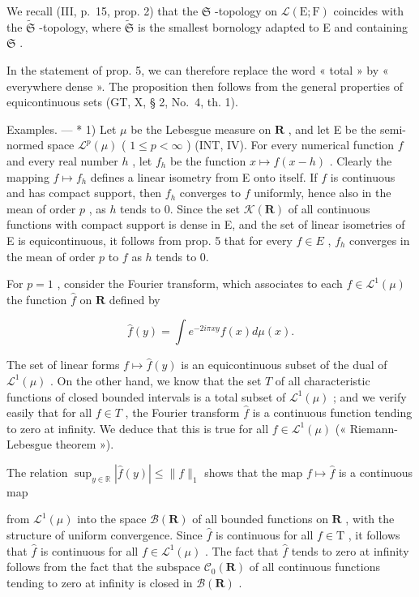 We recall (III, p.~15, prop. 2) that the \(\mathfrak{S}\) -topology on \(\mathcal{L}(\mathrm{E};\mathrm{F})\) coincides with the \(\tilde{\mathfrak{S}}\) -topology, where \(\tilde{\mathfrak{S}}\) is the smallest bornology adapted to E and containing \(\mathfrak{S}\) .

In the statement of prop. 5, we can therefore replace the word « total » by « everywhere dense ». The proposition then follows from the general properties of equicontinuous sets (GT, X, § 2, No.~4, th. 1).

Examples. --- * 1) Let \(\mu\) be the Lebesgue measure on \(\mathbf{R}\) , and let E be the semi-normed space \(\mathcal{L}^p(\mu)\) ( \(1 \leqslant p < \infty\) ) (INT, IV). For every numerical function \(f\) and every real number \(h\) , let \(f_h\) be the function \(x \mapsto f(x - h)\) . Clearly the mapping \(f \mapsto f_h\) defines a linear isometry from E onto itself. If \(f\) is continuous and has compact support, then \(f_h\) converges to \(f\) uniformly, hence also in the mean of order \(p\) , as \(h\) tends to 0. Since the set \(\mathcal{K}(\mathbf{R})\) of all continuous functions with compact support is dense in E, and the set of linear isometries of E is equicontinuous, it follows from prop. 5 that for every \(f \in E\) , \(f_h\) converges in the mean of order \(p\) to \(f\) as \(h\) tends to 0.

For \(p = 1\) , consider the Fourier transform, which associates to each \(f \in \mathcal{L}^1(\mu)\) the function \(\hat{f}\) on \(\mathbf{R}\) defined by

\[
\hat {f} (y) = \int e ^ {- 2 i \pi x y} f (x) d \mu (x).
\]

The set of linear forms \(f \mapsto \hat{f}(y)\) is an equicontinuous subset of the dual of \(\mathcal{L}^1(\mu)\) . On the other hand, we know that the set \(T\) of all characteristic functions of closed bounded intervals is a total subset of \(\mathcal{L}^1(\mu)\) ; and we verify easily that for all \(f \in T\) , the Fourier transform \(\hat{f}\) is a continuous function tending to zero at infinity. We deduce that this is true for all \(f \in \mathcal{L}^1(\mu)\) (« Riemann-Lebesgue theorem »).

The relation \(\sup_{y\in \mathbb{R}}|\hat{f} (y)|\leqslant \| f\| _1\) shows that the map \(f\mapsto \hat{f}\) is a continuous map

from \(\mathcal{L}^1 (\mu)\) into the space \(\mathcal{B}(\mathbf{R})\) of all bounded functions on \(\mathbf{R}\) , with the structure of uniform convergence. Since \(\hat{f}\) is continuous for all \(f\in \mathrm{T}\) , it follows that \(\hat{f}\) is continuous for all \(f\in \mathcal{L}^1 (\mu)\) . The fact that \(\hat{f}\) tends to zero at infinity follows from the fact that the subspace \(\mathcal{C}_0(\mathbf{R})\) of all continuous functions tending to zero at infinity is closed in \(\mathcal{B}(\mathbf{R})\) .

